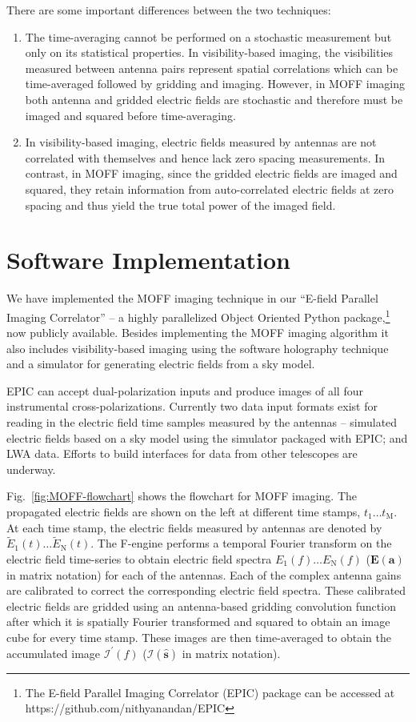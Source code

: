 \documentclass[a4paper,fleqn,usenatbib]{mnras}
\begin{document}
There are some important differences between the two techniques:
\begin{enumerate}
\item The time-averaging cannot be performed on a stochastic measurement but
  only on its statistical properties. In visibility-based imaging, the 
  visibilities measured between antenna pairs represent spatial correlations 
  which can be time-averaged followed by gridding and imaging. However, in MOFF 
  imaging both antenna and gridded electric fields are stochastic and therefore 
  must be imaged and squared before time-averaging. 
\item In visibility-based imaging, electric fields measured by antennas are not 
  correlated with themselves and hence lack zero spacing measurements. In 
  contrast, in MOFF imaging, since the gridded electric fields are imaged and 
  squared, they retain information from auto-correlated electric fields at zero 
  spacing and thus yield the true total power of the imaged field.
\end{enumerate} 

\section{Software Implementation}\label{sec:software}

We have implemented the MOFF imaging technique in our ``E-field Parallel Imaging
Correlator'' -- a highly parallelized Object Oriented Python 
package,\footnote{The E-field Parallel Imaging Correlator (EPIC) package can be 
accessed at https://github.com/nithyanandan/EPIC} now publicly available. Besides 
implementing the MOFF imaging algorithm it also includes visibility-based imaging 
using the software holography technique and a simulator for generating electric 
fields from a sky model. 

EPIC can accept dual-polarization inputs and produce images of all four 
instrumental cross-polarizations. Currently two data input formats exist for 
reading in the 
electric field time samples measured by the antennas -- simulated electric 
fields based on a sky model using the simulator packaged with EPIC; and LWA 
data. Efforts to build interfaces for data from other telescopes are underway.

Fig.~\ref{fig:MOFF-flowchart} shows the flowchart for MOFF imaging. The propagated electric fields are shown on the left at different time stamps, $t_1\ldots t_\textrm{M}$. At each time stamp, the electric fields measured by antennas are denoted by $\widetilde{E}_1(t)\ldots \widetilde{E}_\textrm{N}(t)$. The F-engine performs a temporal Fourier transform on the electric field time-series to obtain electric field spectra $E_1(f)\ldots E_\textrm{N}(f)$ ($\mathbf{E}(\mathbf{a})$ in matrix notation) for each of the antennas. Each of the complex antenna gains are calibrated to correct the corresponding electric field spectra. These calibrated electric fields are gridded using an antenna-based gridding convolution function after which it is spatially Fourier transformed and squared to obtain an image cube for every time stamp. These images are then time-averaged to obtain the accumulated image $\mathcal{I}^\prime(f)$ ($\boldsymbol{\mathcal{I}}(\hat{\mathbf{s}})$ in matrix notation).
\end{document}
